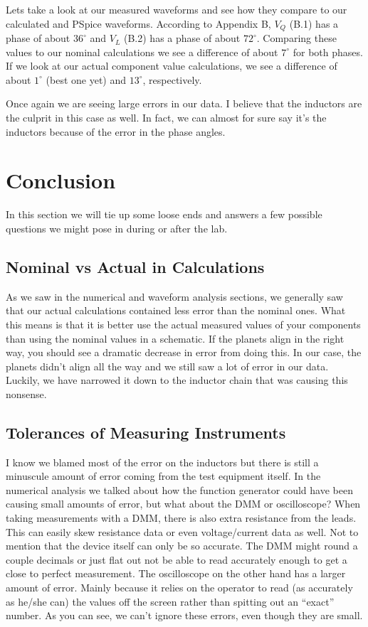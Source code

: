 \documentclass[12pt,a4paper,titlepage]{article}
\begin{document}
Lets take a look at our measured waveforms and see how they compare to our
calculated and PSpice waveforms. According to Appendix B, $V_Q$ (B.1) has a phase
of about $36^{\circ}$ and $V_L$ (B.2) has a phase of about $72^{\circ}$. Comparing
these values to our nominal calculations we see a difference of about $7^{\circ}$
for both phases. If we look at our actual component value calculations, we see
a difference of about $1^{\circ}$ (best one yet) and $13^{\circ}$, respectively.

Once again we are seeing large errors in our data. I believe that the inductors
are the culprit in this case as well. In fact, we can almost for sure say it's the
inductors because of the error in the phase angles.


\section{Conclusion}
In this section we will tie up some loose ends and answers a few possible
questions we might pose in during or after the lab.

\subsection{Nominal vs Actual in Calculations}
As we saw in the numerical and waveform analysis sections, we generally saw
that our actual calculations contained less error than the nominal ones. What
this means is that it is better use the actual measured values of your
components than using the nominal values in a schematic. If the planets align
in the right way, you should see a dramatic decrease in error from doing this.
In our case, the planets didn't align all the way and we still saw a lot of
error in our data. Luckily, we have narrowed it down to the inductor chain
that was causing this nonsense. 

\subsection{Tolerances of Measuring Instruments}
I know we blamed most of the error on the inductors but there is still a minuscule
amount of error coming from the test equipment itself. In the numerical analysis
we talked about how the function generator could have been causing small amounts
of error, but what about the DMM or oscilloscope? When taking measurements with
a DMM, there is also extra resistance from the leads. This can easily skew
resistance data or even voltage/current data as well. Not to mention that the
device itself can only be so accurate. The DMM might round a couple decimals
or just flat out not be able to read accurately enough to get a close to perfect
measurement. The oscilloscope on the other hand has a larger amount of error.
Mainly because it relies on the operator to read (as accurately as he/she can)
the values off the screen rather than spitting out an ``exact'' number. As you
can see, we can't ignore these errors, even though they are small.
\end{document}
